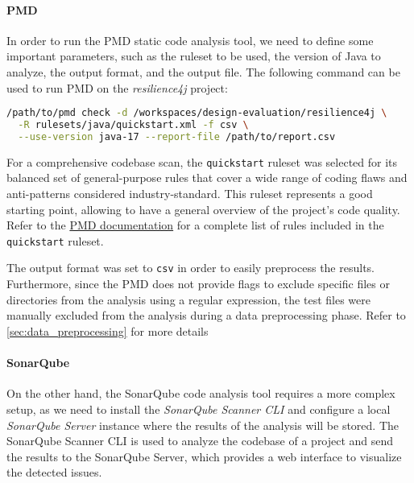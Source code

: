 \paragraph{PMD}
\label{sec:pmd_usage}

In order to run the PMD static code analysis tool, we need to define some important parameters, such as the ruleset to be used, the version of Java to analyze, the output format, and the output file. The following command can be used to run PMD on the \textit{resilience4j} project:

\begin{lstlisting}[language=bash, caption={Command to run PDM static code analysis}]
/path/to/pmd check -d /workspaces/design-evaluation/resilience4j \
  -R rulesets/java/quickstart.xml -f csv \
  --use-version java-17 --report-file /path/to/report.csv
\end{lstlisting}

\noindent For a comprehensive codebase scan, the \texttt{quickstart} ruleset was selected for its balanced set of general-purpose rules that cover a wide range of coding flaws and anti-patterns considered industry-standard. This ruleset represents a good starting point, allowing to have a general overview of the project's code quality. Refer to the \href{https://pmd.github.io/pmd/pmd_rules_java.html#additional-rulesets}{PMD documentation} for a complete list of rules included in the \texttt{quickstart} ruleset.

The output format was set to \texttt{csv} in order to easily preprocess the results. Furthermore, since the PMD does not provide flags to exclude specific files or directories from the analysis using a regular expression, the test files were manually excluded from the analysis during a data preprocessing phase. Refer to \autoref{sec:data_preprocessing} for more details

\paragraph{SonarQube}

On the other hand, the SonarQube code analysis tool requires a more complex setup, as we need to install the \textit{SonarQube Scanner CLI} and configure a local \textit{SonarQube Server} instance where the results of the analysis will be stored. The SonarQube Scanner CLI is used to analyze the codebase of a project and send the results to the SonarQube Server, which provides a web interface to visualize the detected issues.

